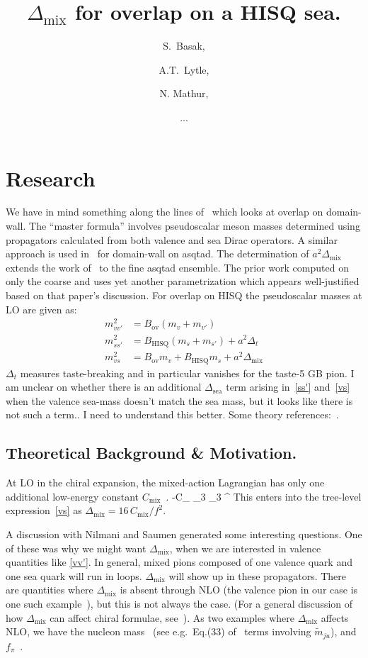 \documentclass[11pt,a4paper]{article}
\title{\boldmath $\Delta_\text{mix}$ for overlap on a HISQ sea.}
\author{S.\ Basak,}
\author{A.T.\ Lytle,}
\author{N. Mathur,}
\author{...}
\newcommand{\Dmix}[0]{\Delta_{\text{mix}}}
\begin{document}
\maketitle
\section{Research}
We have in mind something along the lines of~\cite{Lujan:2012wg} which looks at overlap
on domain-wall.  The ``master formula'' involves pseudoscalar meson masses determined
using propagators calculated from both valence and sea Dirac operators.
A similar approach is used in~\cite{Aubin:2008wk} for domain-wall on asqtad.
The determination of $a^2 \Delta_\text{mix}$ extends the work of~\cite{Orginos:2007tw} to the fine asqtad ensemble.
The prior work computed on only the coarse and uses yet another parametrization which 
appears well-justified based on that paper's discussion.
For overlap on HISQ the pseudoscalar
masses at LO are given as:
\begin{align}
m^2_{vv'} &= B_{\text{ov}} (m_v + m_{v'}) \label{vv'} \\
m^2_{ss'} &= B_{\text{HISQ}}(m_s + m_{s'}) + a^2 \Delta_{t} \label{ss'}\\
m^2_{vs} &= B_{\text{ov}} m_v + B_{\text{HISQ}} m_s + a^2 \Delta_\text{mix} \label{vs}
\end{align}
$\Delta_t$ measures taste-breaking and in particular vanishes for the taste-5 GB pion.
I am unclear on whether there is an additional $\Delta_{\text{sea}}$ term
arising in~\eqref{ss'} and~\eqref{vs} when the valence sea-mass doesn't match the sea mass,
but it looks like there is not such a term.. I need to understand this better.
Some theory references:~\cite{Aubin:2003mg,Bar:2005tu,Chen:2006wf}.
\subsection{Theoretical Background \& Motivation.}
At LO in the chiral expansion, the mixed-action Lagrangian has only one additional low-energy 
constant $C_\text{mix}$~\cite{Bar:2005tu}.  
\be
{} \ni -C_{} \langle \tau_3 \Sigma \tau_3 \Sigma^\dagger \rangle
\ee
This enters into the tree-level expression~\eqref{vs} as
$\Dmix = 16 \,C_\text{mix}/{f^2}$.

A discussion with Nilmani and Saumen generated some interesting questions.
One of these was why we might want $\Dmix$, when we are interested in valence quantities
like \eqref{vv'}.
In general, mixed pions composed of one valence quark and one sea quark will run in loops.  
$\Dmix$ will show up in these propagators.
There are quantities where $\Dmix$ is absent through NLO 
(the valence pion in our case is one such example~\cite{Chen:2006wf,Bar:2003mh}), 
but this is not always the case. (For a general discussion of how $\Dmix$
can affect chiral formulae, see~\cite{Chen:2007ug}).
As two examples where $\Dmix$ affects NLO, we have the nucleon mass~\cite{Tiburzi:2005is} 
(see e.g.\ Eq.(33) of~\cite{WalkerLoud:2008bp} terms involving $\tilde{m}_{ju}$),
and $f_\pi$~\cite{Bar:2005tu,Chen:2006wf}.
\end{document}
